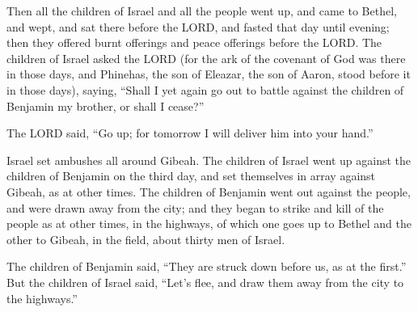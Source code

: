  Then all the children of Israel and all the people went
up, and came to Bethel, and wept, and sat there before the LORD, and
fasted that day until evening; then they offered burnt offerings and
peace offerings before the LORD.  The children of Israel
asked the LORD (for the ark of the covenant of God was there in those
days,  and Phinehas, the son of Eleazar, the son of
Aaron, stood before it in those days), saying, ``Shall I yet again go
out to battle against the children of Benjamin my brother, or shall I
cease?''

The LORD said, ``Go up; for tomorrow I will deliver him into your
hand.''

 Israel set ambushes all around Gibeah. 
The children of Israel went up against the children of Benjamin on the
third day, and set themselves in array against Gibeah, as at other
times.  The children of Benjamin went out against the
people, and were drawn away from the city; and they began to strike and
kill of the people as at other times, in the highways, of which one goes
up to Bethel and the other to Gibeah, in the field, about thirty men of
Israel.

 The children of Benjamin said, ``They are struck down
before us, as at the first.'' But the children of Israel said, ``Let's
flee, and draw them away from the city to the highways.''

